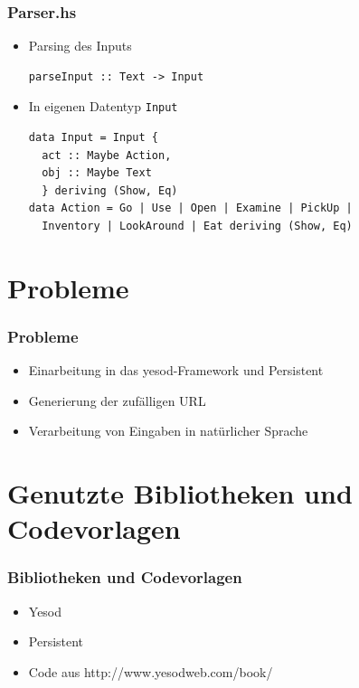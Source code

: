 \documentclass[hyperref={pdfpagelabels=false}]{beamer}
\begin{document}
\begin{frame}[fragile]
  \frametitle{Parser.hs}
  \begin{itemize}
    \item Parsing des Inputs
      \begin{lstlisting}
parseInput :: Text -> Input
      \end{lstlisting}
    \item In eigenen Datentyp \verb|Input|
    \begin{lstlisting}
data Input = Input {
  act :: Maybe Action,
  obj :: Maybe Text
  } deriving (Show, Eq)
data Action = Go | Use | Open | Examine | PickUp |
  Inventory | LookAround | Eat deriving (Show, Eq)
    \end{lstlisting}
  \end{itemize}
\end{frame}
\section{Probleme}
\begin{frame}
  \frametitle{Probleme}
  \begin{itemize}
    \item Einarbeitung in das yesod-Framework und Persistent
    \item Generierung der zufälligen URL
    \item Verarbeitung von Eingaben in natürlicher Sprache
  \end{itemize}
\end{frame}
\section{Genutzte Bibliotheken und Codevorlagen}
\begin{frame}
  \frametitle{Bibliotheken und Codevorlagen}
  \begin{itemize}
    \item Yesod
    \item Persistent
    \item Code aus http://www.yesodweb.com/book/
  \end{itemize}
\end{frame}
\end{document}
